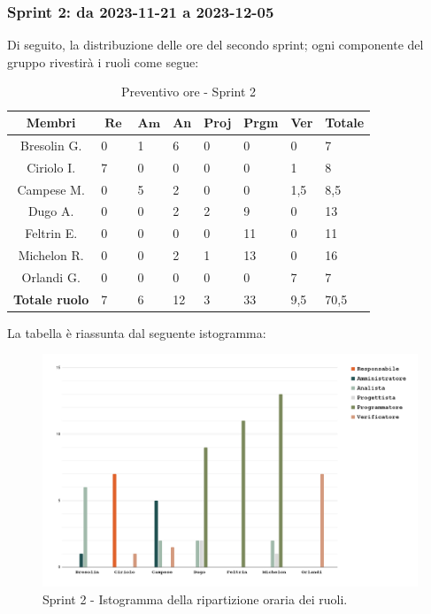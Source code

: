 \documentclass[10pt, a4paper]{article}
\begin{document}
\subsubsection{Sprint 2: da 2023-11-21 a 2023-12-05 }
Di seguito, la distribuzione delle ore del secondo sprint; ogni componente del gruppo rivestirà i ruoli come segue:
\begin{table}[H]
\begin{tabularx}{\textwidth}{c|X|X|X|X|X|X|X}
        \textbf{Membri} & $\operatorname{\textbf{Re}}$ & $\mathrm{\textbf{Am}}$ & \textbf{An} & \textbf{Proj} & \textbf{Prgm} & \textbf{Ver} & \textbf{Totale} \\
        \hline Bresolin G. & 0 & 1 & \cellcolor{primarycolor}6 & 0 & 0 & 0 & 7 \\
        \hline Ciriolo I.  & \cellcolor{primarycolor}7 & 0 & 0 & 0 & 0 & 1 & 8 \\
        \hline Campese M.  & 0 & \cellcolor{primarycolor}5 & 2 & 0 & 0 & 1,5 & 8,5 \\
        \hline Dugo A.     & 0 & 0 & 2 & \cellcolor{primarycolor}2 & 9 & 0 & 13 \\
        \hline Feltrin E.  & 0 & 0 & 0 & 0 & \cellcolor{primarycolor}11 & 0 & 11 \\
        \hline Michelon R. & 0 & 0 & 2 & 1 & \cellcolor{primarycolor}13 & 0 & 16 \\
        \hline Orlandi G.  & 0 & 0 & 0 & 0 & 0 & \cellcolor{primarycolor}7 & 7 \\
        \hline
        \textbf{Totale ruolo} & 7 & 6 & 12 & 3 & 33 & 9,5 & 70,5 
    \end{tabularx}
    \caption{Preventivo ore - Sprint 2}
    \end{table}
La tabella è riassunta dal seguente istogramma:
 \begin{figure}[H]
        \centering        
        \includegraphics[width=15.5cm]{istogrammi/istogramma_2_periodo.png}
        \caption{Sprint 2 - Istogramma della ripartizione oraria dei ruoli. }
    \end{figure}
\end{document}
